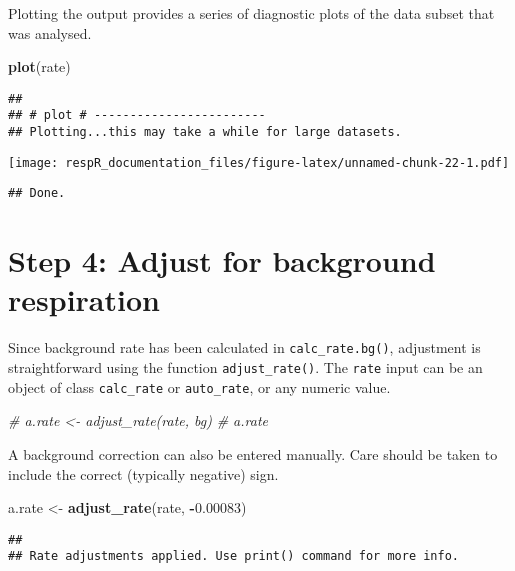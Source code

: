 \documentclass[]{book}
\newenvironment{Shaded}{\begin{snugshade}}{\end{snugshade}}
\newcommand{\KeywordTok}[1]{\textcolor[rgb]{0.13,0.29,0.53}{\textbf{#1}}}
\newcommand{\FloatTok}[1]{\textcolor[rgb]{0.00,0.00,0.81}{#1}}
\newcommand{\StringTok}[1]{\textcolor[rgb]{0.31,0.60,0.02}{#1}}
\newcommand{\CommentTok}[1]{\textcolor[rgb]{0.56,0.35,0.01}{\textit{#1}}}
\newcommand{\OperatorTok}[1]{\textcolor[rgb]{0.81,0.36,0.00}{\textbf{#1}}}
\newcommand{\NormalTok}[1]{#1}
\begin{document}
Plotting the output provides a series of diagnostic plots of the data
subset that was analysed.

\begin{Shaded}
\begin{Highlighting}[]
\KeywordTok{plot}\NormalTok{(rate)}
\end{Highlighting}
\end{Shaded}

\begin{verbatim}
## 
## # plot # ------------------------
## Plotting...this may take a while for large datasets.
\end{verbatim}

\texttt{[image: respR\_documentation\_files/figure-latex/unnamed-chunk-22-1.pdf]}

\begin{verbatim}
## Done.
\end{verbatim}

\section{Step 4: Adjust for background
respiration}\label{step-4-adjust-for-background-respiration}

Since background rate has been calculated in \texttt{calc\_rate.bg()},
adjustment is straightforward using the function
\texttt{adjust\_rate()}. The \texttt{rate} input can be an object of
class \texttt{calc\_rate} or \texttt{auto\_rate}, or any numeric value.

\begin{Shaded}
\begin{Highlighting}[]
\CommentTok{# a.rate <- adjust_rate(rate, bg)}
\CommentTok{# a.rate}
\end{Highlighting}
\end{Shaded}

A background correction can also be entered manually. Care should be
taken to include the correct (typically negative) sign.

\begin{Shaded}
\begin{Highlighting}[]
\NormalTok{a.rate <-}\StringTok{ }\KeywordTok{adjust_rate}\NormalTok{(rate, }\OperatorTok{-}\FloatTok{0.00083}\NormalTok{)}
\end{Highlighting}
\end{Shaded}

\begin{verbatim}
## 
## Rate adjustments applied. Use print() command for more info.
\end{verbatim}
\end{document}
